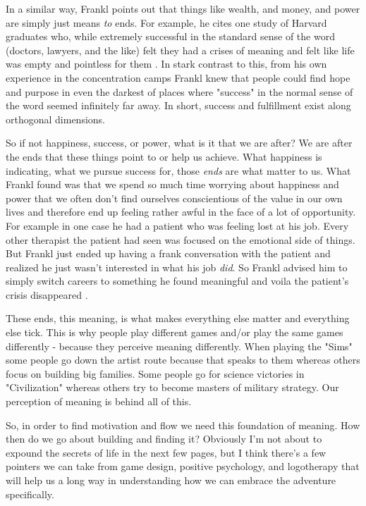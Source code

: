 \documentclass[11pt,a5paper]{book}
\begin{document}
In a similar way, Frankl points out that things like wealth, and money, and power are simply just means \textit{to} ends. For example, he cites one study of Harvard graduates who, while extremely successful in the standard sense of the word (doctors, lawyers, and the like) felt they had a crises of meaning and felt like life was empty and pointless for them \cite{frankl}. In stark contrast to this, from his own experience in the concentration camps Frankl knew that people could find hope and purpose in even the darkest of places where "success" in the normal sense of the word seemed infinitely far away. In short, success and fulfillment exist along orthogonal dimensions. 
\newline

So if not happiness, success, or power, what is it that we are after? We are after the ends that these things point to or help us achieve. What happiness is indicating, what we pursue success for, those \textit{ends} are what matter to us. What Frankl found was that we spend so much time worrying about happiness and power that we often don't find ourselves conscientious of the value in our own lives and therefore end up feeling rather awful in the face of a lot of opportunity. For example in one case he had a patient who was feeling lost at his job. Every other therapist the patient had seen was focused on the emotional side of things. But Frankl just ended up having a frank conversation with the patient and realized he just wasn't interested in what his job \textit{did}. So Frankl advised him to simply switch careers to something he found meaningful and voila the patient's crisis disappeared \cite{ikigai}. 
\newline

These ends, this meaning, is what makes everything else matter and everything else tick. This is why people play different games and/or play the same games differently - because they perceive meaning differently. When playing the "Sims" some people go down the artist route because that speaks to them whereas others focus on building big families. Some people go for science victories in "Civilization" whereas others try to become masters of military strategy. Our perception of meaning is behind all of this. 
\newline

So, in order to find motivation and flow we need this foundation of meaning. How then do we go about building and finding it? Obviously I'm not about to expound the secrets of life in the next few pages, but I think there's a few pointers we can take from game design, positive psychology, and logotherapy that will help us a long way in understanding how we can embrace the adventure specifically.
\end{document}
